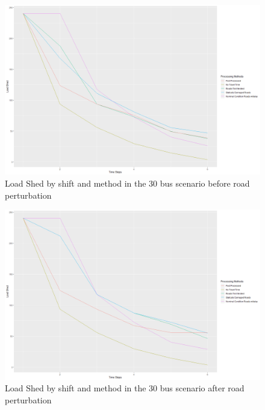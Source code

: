 \documentclass{article}
\begin{document}
	\begin{figure}[H]
		\centering
		\includegraphics[width=.9\linewidth]{Rplot30Unperturbed.png}
		\caption{Load Shed by shift and method in the 30 bus scenario before road perturbation}
		\label{fig:sub2}
		
		
	\end{figure}
	\begin{figure}[H]
	\centering
	\includegraphics[width=.9\linewidth]{Rplot30Perturbed.png}
	\caption{Load Shed by shift and method in the 30 bus scenario after road perturbation}
	\label{fig:sub2}
	
	
	\end{figure}
	
\end{document}
